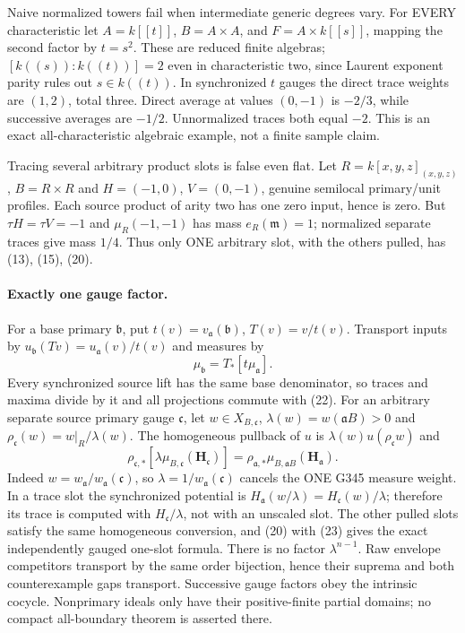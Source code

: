 Naive normalized towers fail when intermediate generic degrees vary. For EVERY characteristic let $A=k[[t]]$, $B=A\times A$, and $F=A\times k[[s]]$, mapping the second factor by $t=s^2$. These are reduced finite algebras; $[k((s)):k((t))]=2$ even in characteristic two, since Laurent exponent parity rules out $s\in k((t))$. In synchronized $t$ gauges the direct trace weights are $(1,2)$, total three. Direct average at values $(0,-1)$ is $-2/3$, while successive averages are $-1/2$. Unnormalized traces both equal $-2$. This is an exact all-characteristic algebraic example, not a finite sample claim.

Tracing several arbitrary product slots is false even flat. Let $R=k[x,y,z]_{(x,y,z)}$, $B=R\times R$ and $H=(-1,0)$, $V=(0,-1)$, genuine semilocal primary/unit profiles. Each source product of arity two has one zero input, hence is zero. But $\tau H=\tau V=-1$ and $\mu_R(-1,-1)$ has mass $e_R(\mathfrak m)=1$; normalized separate traces give mass $1/4$. Thus only ONE arbitrary slot, with the others pulled, has (13), (15), (20).

\paragraph{Exactly one gauge factor.}
For a base primary $\mathfrak b$, put $t(v)=v_{\mathfrak a}(\mathfrak b)$, $T(v)=v/t(v)$. Transport inputs by $u_{\mathfrak b}(Tv)=u_{\mathfrak a}(v)/t(v)$ and measures by
\[
 \mu_{\mathfrak b}=T_*[t\mu_{\mathfrak a}]. \tag{22}
\]
Every synchronized source lift has the same base denominator, so traces and maxima divide by it and all projections commute with (22). For an arbitrary separate source primary gauge $\mathfrak c$, let $w\in X_{B,\mathfrak c}$,
$\lambda(w)=w(\mathfrak aB)>0$ and $\rho_{\mathfrak c}(w)=w|_R/\lambda(w)$. The homogeneous pullback of $u$ is $\lambda(w)u(\rho_{\mathfrak c}w)$ and
\[
 \rho_{\mathfrak c,*}[\lambda\mu_{B,\mathfrak c}(\boldsymbol H_{\mathfrak c})]
 =\rho_{\mathfrak a,*}\mu_{B,\mathfrak aB}(\boldsymbol H_{\mathfrak a}). \tag{23}
\]
Indeed $w=w_{\mathfrak a}/w_{\mathfrak a}(\mathfrak c)$, so $\lambda=1/w_{\mathfrak a}(\mathfrak c)$ cancels the ONE G345 measure weight. In a trace slot the synchronized potential is $H_{\mathfrak a}(w/\lambda)=H_{\mathfrak c}(w)/\lambda$; therefore its trace is computed with $H_{\mathfrak c}/\lambda$, not with an unscaled slot. The other pulled slots satisfy the same homogeneous conversion, and (20) with (23) gives the exact independently gauged one-slot formula. There is no factor $\lambda^{n-1}$. Raw envelope competitors transport by the same order bijection, hence their suprema and both counterexample gaps transport. Successive gauge factors obey the intrinsic cocycle. Nonprimary ideals only have their positive-finite partial domains; no compact all-boundary theorem is asserted there.

